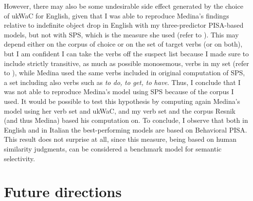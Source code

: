However, there may also be some undesirable side effect generated by the choice of ukWaC for English, given that I was able to reproduce Medina's findings relative to indefinite object drop in English with my three-predictor PISA-based models, but not with SPS, which is the measure she used (refer to ). This may depend either on the corpus of choice or on the set of target verbs (or on both), but I am confident I can take the verbs off the suspect list because I made sure to include strictly transitive, as much as possible monosemous, verbs in my set (refer to ), while Medina used the same verbs included in  original computation of SPS, a set including also verbs such as \textit{to do, to get, to have}. Thus, I conclude that I was not able to reproduce Medina's model using SPS because of the corpus I used. It would be possible to test this hypothesis by computing again Medina's model using her verb set and ukWaC, and my verb set and the corpus Resnik (and thus Medina) based his computation on. %
To conclude, I observe that both in English and in Italian the best-performing models are based on Behavioral PISA. This result does not surprise at all, since this measure, being based on human similarity judgments, can be considered a benchmark model for semantic selectivity.


\section{Future directions} 

